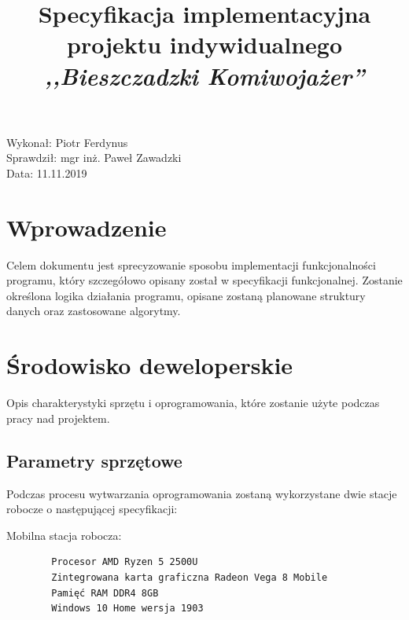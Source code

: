 \documentclass{article}
\title{Specyfikacja implementacyjna projektu indywidualnego \textit{,,Bieszczadzki Komiwojażer''}}
\begin{document}
\begin{titlepage}
\makeatletter
\noindent
\vspace{25pt}
\begin{center}
\Large\textsc{\@title}
\end{center}
\makeatother
\vspace{300pt}
\begin{flushright}
\noindent Wykonał: Piotr Ferdynus\\
Sprawdził: mgr inż. Paweł Zawadzki\\
Data: 11.11.2019\\
\end{flushright}


\thispagestyle{empty}
\end{titlepage}

\lhead{}
\cfoot{\thepage \hspace{1pt} / \pageref{LastPage}}
\setcounter{page}{2}

\section{Wprowadzenie}

Celem dokumentu jest sprecyzowanie sposobu implementacji funkcjonalności programu, który szczegółowo opisany został w specyfikacji funkcjonalnej. Zostanie określona logika działania programu, opisane zostaną planowane struktury danych oraz zastosowane algorytmy.


\section{Środowisko deweloperskie}
Opis charakterystyki sprzętu i oprogramowania, które zostanie użyte podczas pracy nad projektem.

\subsection{Parametry sprzętowe}
Podczas procesu wytwarzania oprogramowania zostaną wykorzystane dwie stacje robocze o następującej specyfikacji:

    Mobilna stacja robocza:
    
\begin{verbatim}
        Procesor AMD Ryzen 5 2500U
        Zintegrowana karta graficzna Radeon Vega 8 Mobile
        Pamięć RAM DDR4 8GB
        Windows 10 Home wersja 1903
\end{verbatim}    
\end{document}

